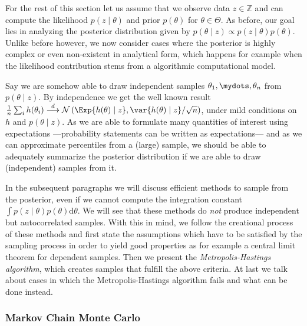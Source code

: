 For the rest of this section let us assume that we observe data $z \in \mathbb{Z}$ and can compute the likelihood $p(z \mid \theta)$ and prior $p(\theta)$ for $\theta \in \Theta$.
As before, our goal lies in analyzing the posterior distribution given by $p(\theta \mid z) \propto p(z \mid \theta) p(\theta)$.
Unlike before however, we now consider cases where the posterior is highly complex or even non-existent in analytical form, which happens for example when the likelihood contribution stems from a algorithmic computational model.

Say we are somehow able to draw independent samples $\theta_1, \mydots, \theta_n$ from $p(\theta \mid z)$.
By independence we get the well known result $\frac{1}{n} \sum_i h(\theta_i) \overset{d}{\longrightarrow} \mathcal{N} \left( \Exp{h(\theta) \mid z}, \var{h(\theta) \mid z} / \sqrt{n} \right)$, under mild conditions on $h$ and $p(\theta \mid z)$.
As we are able to formulate many quantities of interest using expectations ---probability statements can be written as expectations--- and as we can approximate percentiles from a (large) sample, we should be able to adequately summarize the posterior distribution if we are able to draw (independent) samples from it.

In the subsequent paragraphs we will discuss efficient methods to sample from the posterior, even if we cannot compute the integration constant $\int p(z \mid \theta) p(\theta) \mathrm{d}\theta$.
We will see that these methods do \emph{not} produce independent but autocorrelated samples.
With this in mind, we follow the creational process of these methods and first state the assumptions which have to be satisfied by the sampling process in order to yield good properties as for example a central limit theorem for dependent samples.
Then we present the \emph{Metropolis-Hastings algorithm}, which creates samples that fulfill the above criteria.
At last we talk about cases in which the Metropolis-Hastings algorithm fails and what can be done instead.

\subsubsection*{Markov Chain Monte Carlo}

